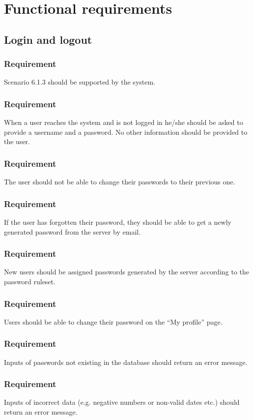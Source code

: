 \documentclass{article}
\begin{document}
\section{Functional requirements}
\subsection{Login and logout}
\subsubsection{Requirement}
Scenario 6.1.3 should be supported by the system.

\subsubsection{Requirement}
 When  a  user  reaches  the  system  and  is  not  logged  in he/she should be asked to provide a username and a password.  No other information should be provided to the user.

\subsubsection{Requirement}
The user should not be able to change their passwords to their previous one.

\subsubsection{Requirement}
If the user has forgotten their password, they should be able to get a newly generated password from the server by email.

\subsubsection{Requirement}
New users should be assigned passwords generated by the server according to the password ruleset.

\subsubsection{Requirement}
Users should be able to change their password on the “My profile” page.
\subsubsection{Requirement}
Inputs of passwords not existing in the database should return an error message.
\subsubsection{Requirement }
Inputs of incorrect data (e.g. negative numbers or non-valid dates etc.) should return an error message.
\end{document}

